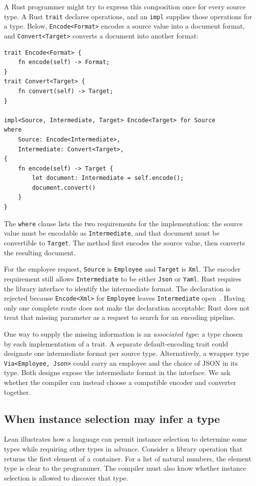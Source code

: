 \documentclass[10pt,a4paper]{article}
\begin{document}
A Rust programmer might try to express this composition once for every source
type. A Rust \texttt{trait} declares operations, and an \texttt{impl} supplies
those operations for a type. Below, \texttt{Encode<Format>} encodes a source value
into a document format, and \texttt{Convert<Target>} converts a document into
another format:
\begin{lstlisting}
trait Encode<Format> {
    fn encode(self) -> Format;
}
trait Convert<Target> {
    fn convert(self) -> Target;
}

impl<Source, Intermediate, Target> Encode<Target> for Source
where
    Source: Encode<Intermediate>,
    Intermediate: Convert<Target>,
{
    fn encode(self) -> Target {
        let document: Intermediate = self.encode();
        document.convert()
    }
}
\end{lstlisting}
The \texttt{where} clause lists the two requirements for the implementation:
the source value must be encodable as \texttt{Intermediate}, and that document
must be convertible to \texttt{Target}. The method first encodes the source
value, then converts the resulting document.

For the employee request, \texttt{Source} is \texttt{Employee} and
\texttt{Target} is \texttt{Xml}. The encoder requirement still allows
\texttt{Intermediate} to be either \texttt{Json} or \texttt{Yaml}.
Rust requires the library interface to identify the intermediate format. The
declaration is rejected because \texttt{Encode<Xml>} for \texttt{Employee}
leaves \texttt{Intermediate} open~\cite{rust-parameters}. Having only one complete
route does not make the declaration acceptable: Rust does not treat that missing
parameter as a request to search for an encoding pipeline.

One way to supply the missing information is an \emph{associated type}: a type
chosen by each implementation of a trait. A separate default-encoding trait could
designate one intermediate format per source type. Alternatively, a wrapper type
\texttt{Via<Employee, Json>} could carry an employee and the choice of JSON in its
type. Both designs expose the intermediate format in the interface. We ask whether
the compiler can instead choose a compatible encoder and converter together.

\newpage
\subsection{When instance selection may infer a type}
Lean illustrates how a language can permit instance selection to determine some
types while requiring other types in advance. Consider a library operation that
returns the first element of a container. For a list of natural numbers, the
element type is clear to the programmer. The compiler must also know whether
instance selection is allowed to discover that type.
\end{document}
